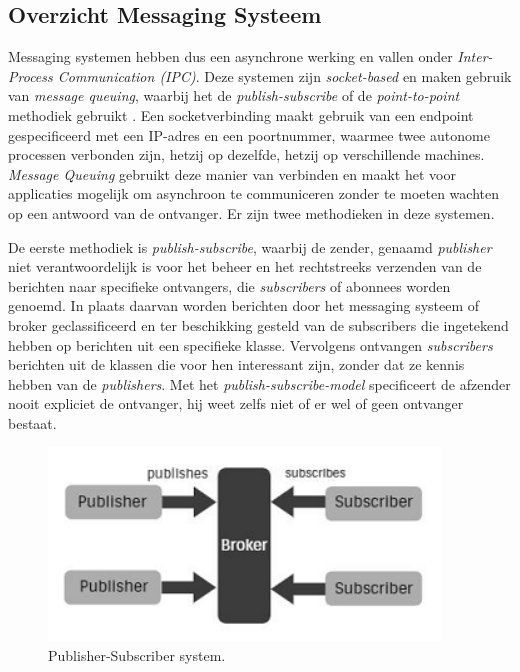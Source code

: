 \subsection{Overzicht Messaging Systeem}
Messaging systemen hebben dus een asynchrone werking en vallen onder \newline \emph{Inter-Process Communication (IPC)}. 
Deze systemen zijn \emph{socket-based} en maken gebruik van \emph{message queuing}, waarbij het de \emph{publish-subscribe} of de \emph{point-to-point} methodiek gebruikt \autocite{Dinari2020}. 
\newline
Een socketverbinding maakt gebruik van een endpoint gespecificeerd met een IP-adres en een \newline poortnummer, 
waarmee twee autonome processen verbonden zijn, hetzij op dezelfde, hetzij op verschillende machines.
\newline
\emph{Message Queuing} gebruikt deze manier van verbinden en maakt het voor applicaties mogelijk om asynchroon 
te communiceren zonder te moeten wachten op een antwoord van de ontvanger. 
Er zijn twee methodieken in deze systemen. 
\newline

De eerste methodiek is \emph{publish-subscribe}, waarbij de zender, genaamd \emph{publisher} niet verantwoordelijk is voor het beheer 
en het rechtstreeks verzenden van de berichten naar specifieke ontvangers, die \emph{subscribers} of abonnees worden genoemd. 
In plaats daarvan worden berichten door het messaging systeem of broker geclassificeerd en ter 
beschikking gesteld van de subscribers die ingetekend hebben op berichten uit een specifieke klasse.
Vervolgens ontvangen \emph{subscribers} berichten uit de klassen die voor hen interessant zijn, zonder dat ze kennis hebben van de \emph{publishers}.
Met het \emph{publish-subscribe-model} specificeert de afzender nooit expliciet de ontvanger,
hij weet zelfs niet of er wel of geen ontvanger bestaat.
\newline

\begin{figure}[h]
  \centering
  \includegraphics[width=.4\textwidth]{../voorstel/img/fig1-publish-subscribe.png}
  \caption{\label{fig:img}Publisher-Subscriber system\autocite{Sharvari2019}.}
\end{figure}

